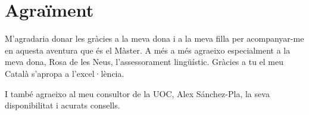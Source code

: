 

\chapter*{Agraïment}
\label{cha:abstract}

M’agradaria donar les gràcies a la meva dona i a la meva filla per acompanyar-me en aquesta aventura que és el Màster. A més a més agraeixo especialment a la meva dona, Rosa de les Neus, l'assessorament lingüístic. Gràcies a tu el meu Català s’apropa a l’excel·lència.

I també agraeixo al meu consultor de la UOC, Alex Sánchez-Pla, la seva disponibilitat i acurats consells.